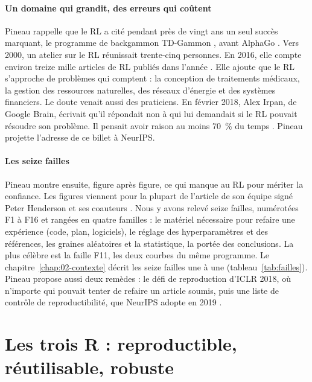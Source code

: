 \paragraph{Un domaine qui grandit, des erreurs qui coûtent}
Pineau rappelle que le RL a cité pendant près de vingt ans un seul succès marquant, le programme de
backgammon TD-Gammon \parencite{tesauro1995tdgammon}, avant AlphaGo \parencite{silver2016alphago}. Vers 2000, un atelier sur le RL
réunissait trente-cinq personnes. En 2016, elle compte environ treize mille articles de RL publiés dans
l'année \parencite{pineau2018iclr}. Elle ajoute que le RL s'approche de problèmes qui comptent : la
conception de traitements médicaux, la gestion des ressources naturelles, des réseaux d'énergie et des
systèmes financiers. Le doute venait aussi des praticiens. En février 2018, Alex Irpan, de Google Brain,
écrivait qu'il répondait non à qui lui demandait si le RL pouvait résoudre son problème. Il pensait avoir raison au moins 70~\% du temps \parencite{irpan2018rlhard}. Pineau projette l'adresse de ce
billet à NeurIPS.

\paragraph{Les seize failles}
Pineau montre ensuite, figure après figure, ce qui manque au RL pour mériter la confiance. Les figures
viennent pour la plupart de l'article de son équipe signé Peter Henderson et ses coauteurs
\parencite{henderson2018matters}. Nous y avons relevé seize failles, numérotées F1 à F16 et rangées en
quatre familles : le matériel nécessaire pour refaire une expérience (code, plan, logiciels), le
réglage des hyperparamètres et des références, les graines aléatoires et la statistique, la portée des
conclusions. La plus célèbre est la faille F11, les deux courbes du même programme. Le chapitre~\ref{chap:02-contexte} décrit les seize failles une à une (tableau~\ref{tab:failles}). Pineau propose aussi deux
remèdes : le défi de reproduction d'ICLR 2018, où n'importe qui pouvait tenter de refaire un article
soumis, puis une liste de contrôle de reproductibilité, que NeurIPS adopte en 2019
\parencite{pineau2021improving}.

\section{Les trois R : reproductible, réutilisable, robuste}\label{sec:intro-trois-r}


